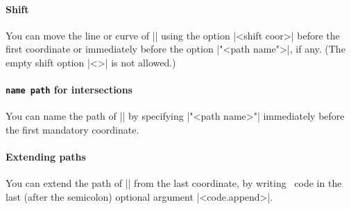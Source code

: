 \paragraph{Shift}
You can move the line or curve of |\tztos|
using the option |<shift coor>| before the first coordinate or immediately before the option |"<path name">|, if any.
(The empty shift option |<>| is not allowed.)

\begin{tzcode}{.3}
\end{tzcode}



\paragraph{\texttt{name path} for intersections}
You can name the path of |\tztos| by specifying |"<path name>"| immediately before the first mandatory coordinate.

\begin{tzcode}{.3}
\end{tzcode}


\paragraph{Extending paths}
You can extend the path of |\tztos| from the last coordinate,
by writing \Tikz\ code in the last (after the semicolon) optional argument |<code.append>|.

\begin{tzcode}{.3}
{}
\end{tzcode}


